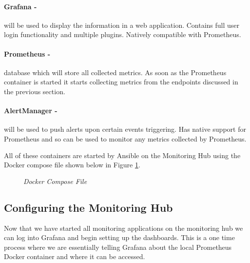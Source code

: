\paragraph{Grafana -}will be used to display the information in a web application. Contains full user login functionality and multiple plugins. Natively compatible with Prometheus.

\paragraph{Prometheus -}database which will store all collected metrics. As soon as the Prometheus container is started it starts collecting metrics from the endpoints discussed in the previous section.

\paragraph{AlertManager -}will be used to push alerts upon certain events triggering. Has native support for Prometheus and so can be used to monitor any metrics collected by Prometheus.

All of these containers are started by Ansible on the Monitoring Hub using the Docker compose file shown below in Figure \ref{fig:combined}.

\begin{figure}[!ht]
\centering
{}
\caption{\em Docker Compose File}
\label{fig:combined}
\end{figure}

\subsection{Configuring the Monitoring Hub}
Now that we have started all monitoring applications on the monitoring hub we can log into Grafana and begin setting up the dashboards. This is a one time process where we are essentially telling Grafana about the local Prometheus Docker container and where it can be accessed.

